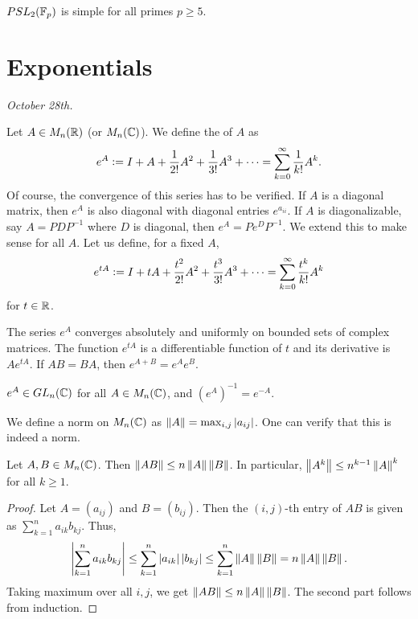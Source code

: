 \begin{corollary}
    $PSL_{2}(\mathbb{F}_{p})$ is simple for all primes $p \geq 5$.
\end{corollary}

\section{Exponentials}

\textit{October 28th.}

Let $A \in M_{n}(\mathbb{R})$ (or $M_{n}(\mathbb{C})$). We define the  of $A$ as
\begin{align}
    e^{A} \vcentcolon= I + A + \frac{1}{2!} A^{2} + \frac{1}{3!} A^{3} + \cdots = \sum_{k=0}^{\infty} \frac{1}{k!} A^{k}.
\end{align}
Of course, the convergence of this series has to be verified. If $A$ is a diagonal matrix, then $e^{A}$ is also diagonal with diagonal entries $e^{a_{ii}}$. If $A$ is diagonalizable, say $A = PDP^{-1}$ where $D$ is diagonal, then $e^{A} = Pe^{D}P^{-1}$. We extend this to make sense for all $A$. Let us define, for a fixed $A$,
\begin{align}
    e^{tA} \vcentcolon= I + tA + \frac{t^{2}}{2!} A^{2} + \frac{t^{3}}{3!} A^{3} + \cdots = \sum_{k=0}^{\infty} \frac{t^{k}}{k!} A^{k}
\end{align}
for $t \in \mathbb{R}$.
\begin{theorem}
    The series $e^{A}$ converges absolutely and uniformly on bounded sets of complex matrices. The function $e^{tA}$ is a differentiable function of $t$ and its derivative is $Ae^{tA}$. If $AB = BA$, then $e^{A+B} = e^{A} e^{B}$.
\end{theorem}

\begin{corollary}
    $e^{A} \in GL_{n}(\mathbb{C})$ for all $A \in M_{n}(\mathbb{C})$, and $(e^{A})^{-1} = e^{-A}$.
\end{corollary}

We define a norm on $M_{n}(\mathbb{C})$ as $\left\lVert A\right\rVert = \max_{i,j} \left| a_{ij} \right|$. One can verify that this is indeed a norm.

\begin{lemma}
    Let $A,B \in M_{n}(\mathbb{C})$. Then $\left\lVert AB\right\rVert \leq n \left\lVert A\right\rVert \left\lVert B\right\rVert$. In particular, $\left\lVert A^{k}\right\rVert \leq n^{k-1} \left\lVert A\right\rVert^{k}$ for all $k \geq 1$.
\end{lemma}

\begin{proof}
    Let $A = (a_{ij})$ and $B = (b_{ij})$. Then the $(i,j)$-th entry of $AB$ is given as $\sum_{k=1}^{n} a_{ik} b_{kj}$. Thus,
    \begin{align}
        \left| \sum_{k=1}^{n} a_{ik} b_{kj} \right| \leq \sum_{k=1}^{n} \left| a_{ik} \right| \left| b_{kj} \right| \leq \sum_{k=1}^{n} \left\lVert A\right\rVert \left\lVert B\right\rVert = n \left\lVert A\right\rVert \left\lVert B\right\rVert.
    \end{align}
    Taking maximum over all $i,j$, we get $\left\lVert AB\right\rVert \leq n \left\lVert A\right\rVert \left\lVert B\right\rVert$. The second part follows from induction.
\end{proof}

